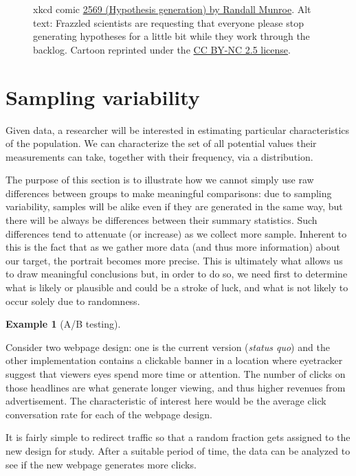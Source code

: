 \documentclass[
  11pt,
  letterpaper,
]{scrbook}
\theoremstyle{definition}
\theoremstyle{definition}
\newtheorem{example}{Example}[chapter]
\theoremstyle{remark}
\begin{document}
\begin{figure}[ht!]


\caption{\label{fig-xkcd2569}xkcd comic
\href{https://xkcd.com/2569/}{2569 (Hypothesis generation) by Randall
Munroe}. Alt text: Frazzled scientists are requesting that everyone
please stop generating hypotheses for a little bit while they work
through the backlog. Cartoon reprinted under the
\href{https://creativecommons.org/licenses/by-nc/2.5/}{CC BY-NC 2.5
license}.}

\end{figure}%

\section{Sampling variability}\label{sampling-variability}

Given data, a researcher will be interested in estimating particular
characteristics of the population. We can characterize the set of all
potential values their measurements can take, together with their
frequency, via a distribution.

The purpose of this section is to illustrate how we cannot simply use
raw differences between groups to make meaningful comparisons: due to
sampling variability, samples will be alike even if they are generated
in the same way, but there will be always be differences between their
summary statistics. Such differences tend to attenuate (or increase) as
we collect more sample. Inherent to this is the fact that as we gather
more data (and thus more information) about our target, the portrait
becomes more precise. This is ultimately what allows us to draw
meaningful conclusions but, in order to do so, we need first to
determine what is likely or plausible and could be a stroke of luck, and
what is not likely to occur solely due to randomness.

\begin{example}[A/B
testing]\protect\hypertarget{exm-ABtest}{}\label{exm-ABtest}

Consider two webpage design: one is the current version (\emph{status
quo}) and the other implementation contains a clickable banner in a
location where eyetracker suggest that viewers eyes spend more time or
attention. The number of clicks on those headlines are what generate
longer viewing, and thus higher revenues from advertisement. The
characteristic of interest here would be the average click conversation
rate for each of the webpage design.

It is fairly simple to redirect traffic so that a random fraction gets
assigned to the new design for study. After a suitable period of time,
the data can be analyzed to see if the new webpage generates more
clicks.

\end{example}
\end{document}
